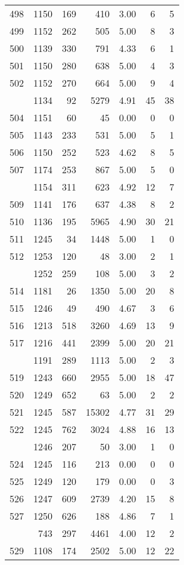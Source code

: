 \documentclass[
]{article}
\begin{document}
\begin{table}
\begin{tabular}[t]{lrrrrrr}
498 & 1150 & 169 & 410 & 3.00 & 6 & 5\\
499 & 1152 & 262 & 505 & 5.00 & 8 & 3\\
500 & 1139 & 330 & 791 & 4.33 & 6 & 1\\
501 & 1150 & 280 & 638 & 5.00 & 4 & 3\\
502 & 1152 & 270 & 664 & 5.00 & 9 & 4\\
\addlinespace
503 & 1134 & 92 & 5279 & 4.91 & 45 & 38\\
504 & 1151 & 60 & 45 & 0.00 & 0 & 0\\
505 & 1143 & 233 & 531 & 5.00 & 5 & 1\\
506 & 1150 & 252 & 523 & 4.62 & 8 & 5\\
507 & 1174 & 253 & 867 & 5.00 & 5 & 0\\
\addlinespace
508 & 1154 & 311 & 623 & 4.92 & 12 & 7\\
509 & 1141 & 176 & 637 & 4.38 & 8 & 2\\
510 & 1136 & 195 & 5965 & 4.90 & 30 & 21\\
511 & 1245 & 34 & 1448 & 5.00 & 1 & 0\\
512 & 1253 & 120 & 48 & 3.00 & 2 & 1\\
\addlinespace
513 & 1252 & 259 & 108 & 5.00 & 3 & 2\\
514 & 1181 & 26 & 1350 & 5.00 & 20 & 8\\
515 & 1246 & 49 & 490 & 4.67 & 3 & 6\\
516 & 1213 & 518 & 3260 & 4.69 & 13 & 9\\
517 & 1216 & 441 & 2399 & 5.00 & 20 & 21\\
\addlinespace
518 & 1191 & 289 & 1113 & 5.00 & 2 & 3\\
519 & 1243 & 660 & 2955 & 5.00 & 18 & 47\\
520 & 1249 & 652 & 63 & 5.00 & 2 & 2\\
521 & 1245 & 587 & 15302 & 4.77 & 31 & 29\\
522 & 1245 & 762 & 3024 & 4.88 & 16 & 13\\
\addlinespace
523 & 1246 & 207 & 50 & 3.00 & 1 & 0\\
524 & 1245 & 116 & 213 & 0.00 & 0 & 0\\
525 & 1249 & 120 & 179 & 0.00 & 0 & 3\\
526 & 1247 & 609 & 2739 & 4.20 & 15 & 8\\
527 & 1250 & 626 & 188 & 4.86 & 7 & 1\\
\addlinespace
528 & 743 & 297 & 4461 & 4.00 & 12 & 2\\
529 & 1108 & 174 & 2502 & 5.00 & 12 & 22\\

\end{tabular}
\end{table}
\end{document}
